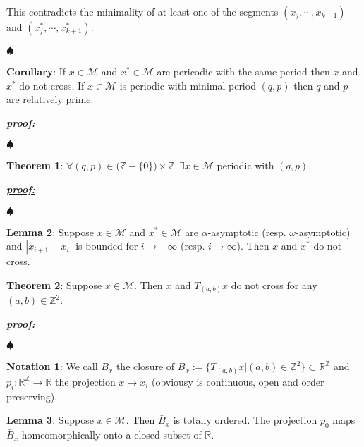 \documentclass{article}
\begin{document}
\begin{itemize}
\begin{itemize}
				This contradicts the minimality of at least one of the segments $(x_{j}, \cdots, x_{k + 1})$ and $(x_{j}^{*}, \cdots, x_{k + 1}^{*})$.
							 
			\end{itemize}
	
			\noindent $\spadesuit$
		\color{black}
		
		
		\textbf{Corollary}: If $x \in \mathcal{M}$ and $x^{*} \in \mathcal{M}$ are pericodic with the same period then $x$ and $x^{*}$ do not cross. If $x \in \mathcal{M}$ is periodic with minimal period $(q, p)$ then $q$ and $p$ are relatively prime.
		
		\color{blue}
			\noindent \underline{\textbf{\textit{proof:}}} 		

	
			\noindent $\spadesuit$
		\color{black}
		
		
	\end{itemize}

\noindent \textbf{Theorem 1}: $\forall (q, p) \in \big( \mathbb{Z} - \{ 0 \} \big) \times \mathbb{Z} \ \ \exists x \in \mathcal{M}$ periodic with $(q, p)$.

\color{blue}
	\noindent \underline{\textbf{\textit{proof:}}} 		

	
	\noindent $\spadesuit$
\color{black}
		
		
\noindent \textbf{Lemma 2}: Suppose $x \in \mathcal{M}$ and $x^{*} \in \mathcal{M}$ are $\alpha$-asymptotic (resp. $\omega$-asymptotic) and $| x_{i + 1} - x_i |$ is bounded for $i \rightarrow - \infty$ (resp. $i \rightarrow  \infty$). Then $x$ and $x^{*}$ do not cross.
		
\noindent \textbf{Theorem 2}: Suppose $x \in \mathcal{M}$. Then $x$ and $T_{(a, b)} x$ do not cross for any $(a, b) \in \mathbb{Z}^{2}$.

\color{blue}
	\noindent \underline{\textbf{\textit{proof:}}} 		

	
	\noindent $\spadesuit$
\color{black}

\noindent \textbf{Notation 1}: We call $\bar{B}_{x}$ the closure of $B_{x} := \{ T_{(a, b)} x | (a, b) \in \mathbb{Z}^{2}  \} \subset \mathbb{R}^{\mathbb{Z}}$ and $p_i: \mathbb{R}^{\mathbb{Z}} \rightarrow \mathbb{R}$ the projection $x \rightarrow x_i$ (obviousy is continuous, open and order preserving).  

\noindent \textbf{Lemma 3}: Suppose $x \in \mathcal{M}$. Then $\bar{B}_{x}$ is totally ordered. The projection $p_0$ maps $\bar{B}_{x}$  homeomorphically onto a closed subset of $\mathbb{R}$.
\end{document}
